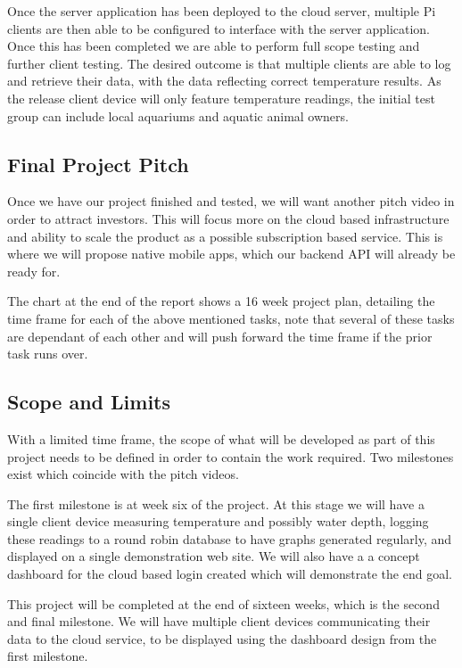 \documentclass[11pt, oneside, a4paper, titlepage]{article}
\begin{document}
Once the server application has been deployed to the cloud server, multiple Pi clients are then able to be configured to interface with the server application. Once this has been completed we are able to perform full scope testing and further client testing. The desired outcome is that multiple clients are able to log and retrieve their data, with the data reflecting correct temperature results. As the release client device will only feature temperature readings, the initial test group can include local aquariums and aquatic animal owners. 

\subsection{Final Project Pitch}
Once we have our project finished and tested, we will want another pitch video in order to attract investors.  This will focus more on the cloud based infrastructure and ability to scale the product as a possible subscription based service.  This is where we will propose native mobile apps, which our backend API will already be ready for.  

The chart at the end of the report shows a 16 week project plan, detailing the time frame for each of the above mentioned tasks, note that several of these tasks are dependant of each other and will push forward the time frame if the prior task runs over. 

\subsection{Scope and Limits}
With a limited time frame, the scope of what will be developed as part of this project needs to be defined in order to contain the work required.  Two milestones exist which coincide with the pitch videos.   

The first milestone is at week six of the project. At this stage we will have a single client device measuring temperature and possibly water depth, logging these readings to a round robin database to have graphs generated regularly, and displayed on a single demonstration web site.  We will also have a a concept dashboard for the cloud based login created which will demonstrate the end goal. 

This project will be completed at the end of sixteen weeks, which is the second and final milestone. We will have multiple client devices communicating their data to the cloud service, to be displayed using the dashboard design from the first milestone.  
\end{document}
